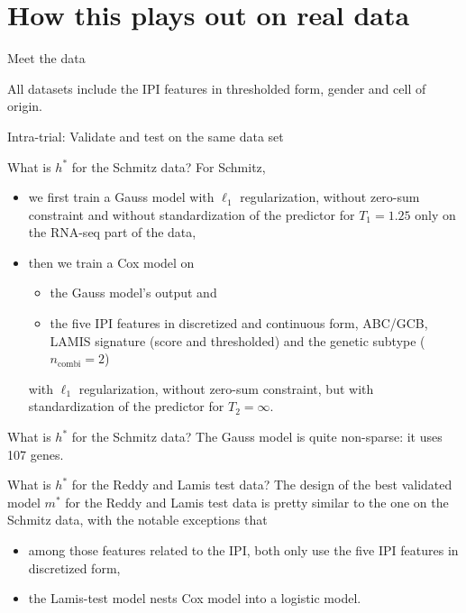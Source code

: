 \documentclass[10pt, aspectratio=169]{beamer}
\begin{document}
\section{How this plays out on real data}

\begin{frame}{Meet the data}
  

  All datasets include the IPI features in thresholded form, gender and cell of 
  origin.
\end{frame}

\begin{frame}{Intra-trial: Validate and test on the same data set}
  
\end{frame}

\begin{frame}{What is $h^*$ for the Schmitz data?}
  For Schmitz,
  \begin{itemize}
    \item we first train a Gauss model with $\ell_1$ regularization, without 
      zero-sum constraint and without standardization of the predictor for 
      $T_1 = 1.25$ only on the RNA-seq part of the data, 
    \pause
    \item then we train a Cox model on 
      \begin{itemize} 
        \item the Gauss model's output and 
        \item the five IPI features in discretized and continuous form, ABC/GCB, LAMIS signature 
          (score and thresholded) and the genetic subtype ($n_{\text{combi}} = 2$)
      \end{itemize}
      with $\ell_1$ regularization, without zero-sum constraint, but with 
      standardization of the predictor for $T_2 = \infty$.
  \end{itemize}
\end{frame}

\begin{frame}{What is $h^*$ for the Schmitz data?}
  The Gauss model is quite non-sparse: it uses 107 genes.

  
\end{frame}

\begin{frame}{What is $h^*$ for the Reddy and Lamis test data?}
  The design of the best validated model $m^*$ for the Reddy and Lamis test 
  data is pretty similar to the one on the Schmitz data, with the notable 
  exceptions that 

  \begin{itemize}
    \item among those features related to the IPI, both only use the five IPI 
      features in discretized form,
    \item the Lamis-test model nests Cox model into a logistic model.
  \end{itemize}
\end{frame}
\end{document}

